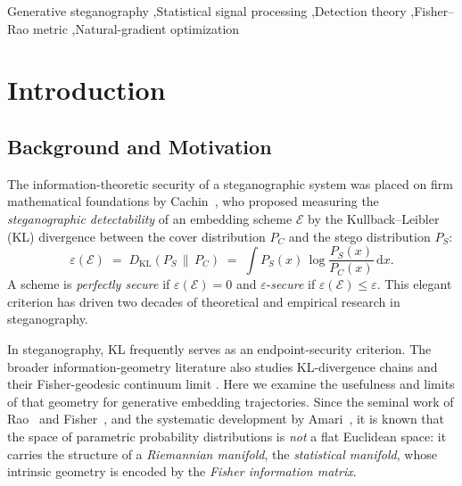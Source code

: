 \documentclass[a4paper,fleqn]{cas-dc}
\newcommand{\DKL}{D_{\mathrm{KL}}}
\begin{document}
\begin{keywords}
Generative steganography \sep Statistical signal processing \sep Detection theory \sep Fisher--Rao metric \sep Natural-gradient optimization
\end{keywords}

\maketitle


\section{Introduction}
\label{sec:intro}

\subsection{Background and Motivation}

The information-theoretic security of a steganographic system was placed on
firm mathematical foundations by Cachin~\cite{cachin1998information}, who
proposed measuring the \emph{steganographic detectability} of an embedding
scheme $\mathcal{E}$ by the Kullback--Leibler (KL) divergence between the
cover distribution $P_C$ and the stego distribution $P_S$:
\begin{equation}
  \varepsilon(\mathcal{E}) \;=\; \DKL\!\left(P_S \,\|\, P_C\right)
  \;=\; \int P_S(x)\,\log\frac{P_S(x)}{P_C(x)}\,\mathrm{d}x.
  \label{eq:cachin_security}
\end{equation}
A scheme is \emph{perfectly secure} if $\varepsilon(\mathcal{E})=0$ and
$\varepsilon$-\emph{secure} if $\varepsilon(\mathcal{E})\leq\varepsilon$.
This elegant criterion has driven two decades of theoretical and empirical
research in steganography.

In steganography, KL frequently serves as an endpoint-security
criterion. The broader information-geometry literature also studies
KL-divergence chains and their Fisher-geodesic continuum limit
\cite{pavlichin2016chained}. Here we examine the usefulness and limits
of that geometry for generative embedding trajectories.
Since the seminal work of Rao~\cite{rao1945information} and
Fisher~\cite{fisher1925theory}, and the systematic development by
Amari~\cite{amari1985differential,amari2000methods}, it is known that
the space of parametric probability distributions is
\emph{not} a flat Euclidean space: it carries the structure of a
\emph{Riemannian manifold}, the \emph{statistical manifold}, whose intrinsic
geometry is encoded by the \emph{Fisher information matrix}.
\end{document}
